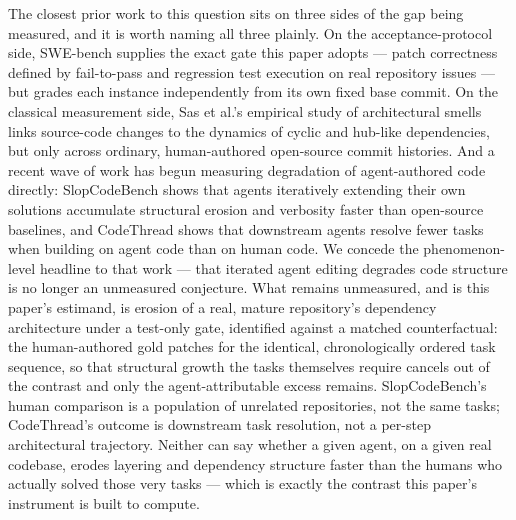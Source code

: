 \documentclass[11pt]{article}
\begin{document}
The closest prior work to this question sits on three sides of the gap being measured, and it is worth naming all three plainly. On the acceptance-protocol side, SWE-bench supplies the exact gate this paper adopts --- patch correctness defined by fail-to-pass and regression test execution on real repository issues --- but grades each instance independently from its own fixed base commit. On the classical measurement side, Sas et al.'s empirical study of architectural smells links source-code changes to the dynamics of cyclic and hub-like dependencies, but only across ordinary, human-authored open-source commit histories. And a recent wave of work has begun measuring degradation of agent-authored code directly: SlopCodeBench shows that agents iteratively extending their own solutions accumulate structural erosion and verbosity faster than open-source baselines, and CodeThread shows that downstream agents resolve fewer tasks when building on agent code than on human code. We concede the phenomenon-level headline to that work --- that iterated agent editing degrades code structure is no longer an unmeasured conjecture. What remains unmeasured, and is this paper's estimand, is erosion of a real, mature repository's dependency architecture under a test-only gate, identified against a matched counterfactual: the human-authored gold patches for the identical, chronologically ordered task sequence, so that structural growth the tasks themselves require cancels out of the contrast and only the agent-attributable excess remains. SlopCodeBench's human comparison is a population of unrelated repositories, not the same tasks; CodeThread's outcome is downstream task resolution, not a per-step architectural trajectory. Neither can say whether a given agent, on a given real codebase, erodes layering and dependency structure faster than the humans who actually solved those very tasks --- which is exactly the contrast this paper's instrument is built to compute.
\end{document}
